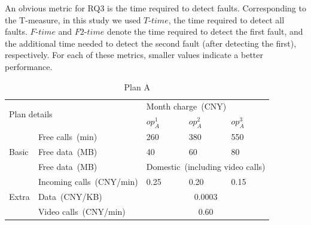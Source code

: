 \documentclass[10pt,journal,compsoc]{IEEEtran}
\begin{document}
An obvious metric for RQ3 is the time required to detect faults.
Corresponding to the T-measure, in this study we used $T$-$time$, the time required to detect all faults.
$F$-$time$ and $F2$-$time$ denote the time required to detect the first fault, and the additional time needed to detect the second fault (after detecting the first), respectively.
For each of these metrics, smaller values indicate a better performance.
\begin{table}[h]
  \caption{Plan A}
  \label{table:chinaC}
  \centering
  \begin{tabular}{lllll} \toprule
  \multicolumn{2}{l}{\multirow{2}{*}{Plan details}}  &\multicolumn{3}{l}{Month charge~(CNY)} \\ \cmidrule(lr){3-5}
  \multicolumn{2}{l}{}                                  &$op_A^1$  &$op_A^2$  &$op_A^3$ \\ \midrule
   \multirow{3}{*}{Basic} &Free calls~(min)  &260  &380  &550 \\
                                          &Free data~(MB)  &40 &60 &80 \\
                                            &Free data~(MB)  &\multicolumn{3}{l}{Domestic~(including video calls)} \\ \midrule
   \multirow{3}{*}{Extra} &Incoming calls~(CNY/min)  &0.25 &0.20  &0.15 \\
                                            &Data~(CNY/KB)  &\multicolumn{3}{c}{0.0003} \\
                                            &Video calls~(CNY/min)  &\multicolumn{3}{c}{0.60} \\ \bottomrule
  \end{tabular}
\end{table}
\end{document}
